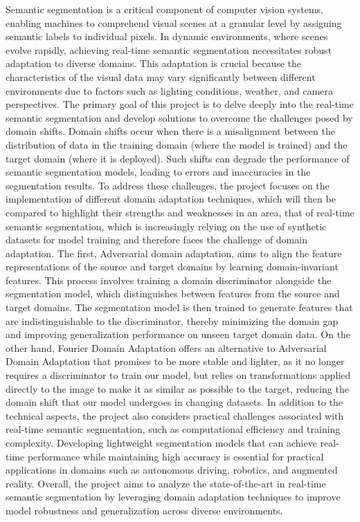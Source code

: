 \documentclass[10pt,twocolumn,letterpaper]{article}
\begin{document}
Semantic segmentation is a critical component of computer vision systems, enabling machines to comprehend visual scenes at a granular level by assigning semantic labels to individual pixels. In dynamic environments, where scenes evolve rapidly, achieving real-time semantic segmentation necessitates robust adaptation to diverse domains. This adaptation is crucial because the characteristics of the visual data may vary significantly between different environments due to factors such as lighting conditions, weather, and camera perspectives.
The primary goal of this project is to delve deeply into the real-time semantic segmentation and develop solutions to overcome the challenges posed by domain shifts. Domain shifts occur when there is a misalignment between the distribution of data in the training domain (where the model is trained) and the target domain (where it is deployed). Such shifts can degrade the performance of semantic segmentation models, leading to errors and inaccuracies in the segmentation results.
To address these challenges, the project focuses on the implementation of different domain adaptation techniques, which will then be compared to highlight their strengths and weaknesses in an area, that of real-time semantic segmentation, which is increasingly relying on the use of synthetic datasets for model training and therefore faces the challenge of domain adaptation.
The first, Adversarial domain adaptation, aims to align the feature representations of the source and target domains by learning domain-invariant features. This process involves training a domain discriminator alongside the segmentation model, which distinguishes between features from the source and target domains. The segmentation model is then trained to generate features that are indistinguishable to the discriminator, thereby minimizing the domain gap and improving generalization performance on unseen target domain data.
On the other hand, Fourier Domain Adaptation offers an alternative to Adversarial Domain Adaptation that promises to be more stable and lighter, as it no longer requires a discriminator to train our model, but relies on transformations applied directly to the image to make it as similar as possible to the target, reducing the domain shift that our model undergoes in changing datasets.
In addition to the technical aspects, the project also considers practical challenges associated with real-time semantic segmentation, such as computational efficiency and training complexity. Developing lightweight segmentation models that can achieve real-time performance while maintaining high accuracy is essential for practical applications in domains such as autonomous driving, robotics, and augmented reality.
Overall, the project aims to analyze the state-of-the-art in real-time semantic segmentation by leveraging domain adaptation techniques to improve model robustness and generalization across diverse environments.
\end{document}
